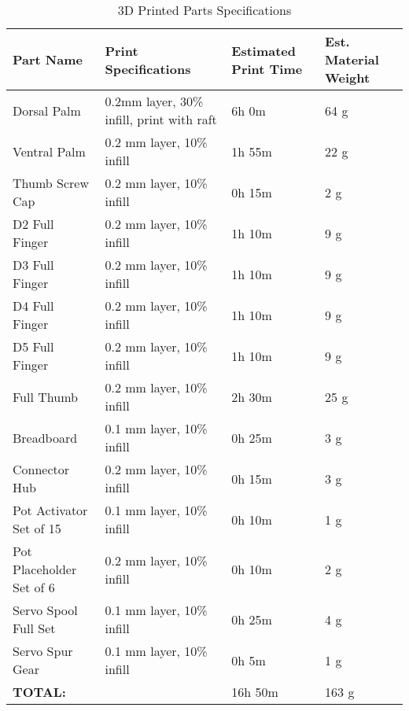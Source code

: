 \begin{table}[H]
\centering
\caption{3D Printed Parts Specifications}
\label{3d_printed_parts_list}
\begin{tabular}{|p{4cm}|p{4cm}|p{2cm}|p{2.5cm}|}
\hline
\textbf{Part Name} & \textbf{Print Specifications} & \textbf{Estimated Print Time} & \textbf{Est. Material Weight} \\ \hline
Dorsal Palm & 0.2mm layer, 30\% infill, print with raft & 6h 0m & 64 g \\ \hline
Ventral Palm & 0.2 mm layer, 10\% infill & 1h 55m & 22 g  \\ \hline
Thumb Screw Cap &0.2 mm layer, 10\% infill &0h 15m &2 g  \\ \hline
D2 Full Finger &0.2 mm layer, 10\% infill &1h 10m &9 g  \\ \hline
D3 Full Finger &0.2 mm layer, 10\% infill &1h 10m &9 g  \\ \hline
D4 Full Finger &0.2 mm layer, 10\% infill &1h 10m &9 g  \\ \hline
D5 Full Finger &0.2 mm layer, 10\% infill &1h 10m &9 g  \\ \hline
Full Thumb &0.2 mm layer, 10\% infill &2h 30m &25 g  \\ \hline
Breadboard &0.1 mm layer, 10\% infill &0h 25m &3 g  \\ \hline
Connector Hub &0.2 mm layer, 10\% infill &0h 15m &3 g  \\ \hline
Pot Activator Set of 15 &0.1 mm layer, 10\% infill &0h 10m &1 g  \\ \hline
Pot Placeholder Set of 6 &0.2 mm layer, 10\% infill &0h 10m &2 g  \\ \hline
Servo Spool Full Set &0.1 mm layer, 10\% infill &0h 25m &4 g  \\ \hline
Servo Spur Gear &0.1 mm layer, 10\% infill &0h 5m &1 g  \\ \hline
\textbf{TOTAL:}&\centering{-}  & 16h 50m & 163 g \\ \hline
\end{tabular}
\end{table} 


